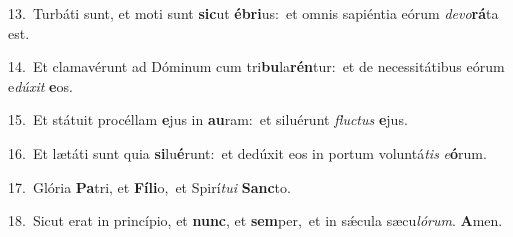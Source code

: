 {\numbfont\textcolor{\numbcolor}{13.}}~Turbáti sunt, et moti sunt \textbf{sic}\-ut \textbf{é}\-\textbf{bri}us:~\star et omnis sapiéntia eórum \textit{de}\-\textit{vo}\textbf{rá}ta est.\par
{\numbfont\textcolor{\numbcolor}{14.}}~Et clamavérunt ad Dóminum cum tri\-\textbf{bu}\-la\-\textbf{rén}\-tur:~\star et de necessitátibus eórum e\-\textit{dú}\-\textit{xit} \textbf{e}\-os.\par
{\numbfont\textcolor{\numbcolor}{15.}}~Et státuit procéllam \textbf{e}\-jus in \textbf{au}\-ram:~\star et siluérunt \textit{fluc}\-\textit{tus} \textbf{e}\-jus.\par
{\numbfont\textcolor{\numbcolor}{16.}}~Et lætáti sunt quia \textbf{si}\-lu\-\textbf{é}\-runt:~\star et dedúxit eos in portum voluntá\textit{tis} \textit{e}\-\textbf{ó}rum.\par
{\numbfont\textcolor{\numbcolor}{17.}}~Glória \textbf{Pa}\-tri, et \textbf{Fí}\-\textbf{li}o,~\star et Spirí\-\textit{tu}\-\textit{i} \textbf{Sanc}\-to.\par
{\numbfont\textcolor{\numbcolor}{18.}}~Sicut erat in princípio, et \textbf{nunc}\-, et \textbf{sem}\-per,~\star et in sǽcula sæcu\-\textit{ló}\-\textit{rum}. \textbf{A}\-men.\par
